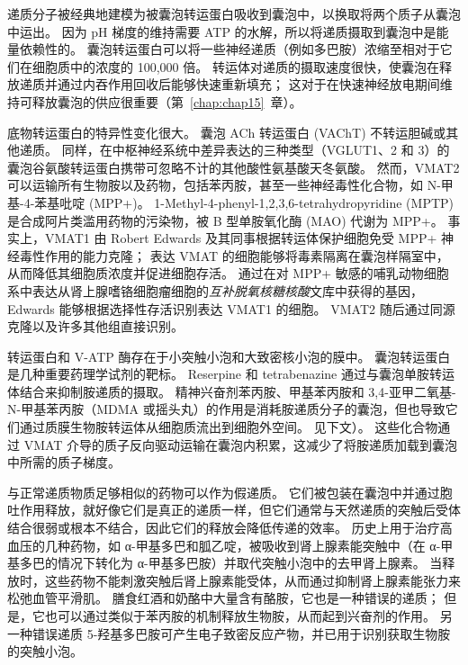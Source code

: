 \begin{figure}[htbp]
	\label{fig:16_1}
\end{figure}


递质分子被经典地建模为被囊泡转运蛋白吸收到囊泡中，以换取将两个质子从囊泡中运出。
因为 pH 梯度的维持需要 ATP 的水解，所以将递质摄取到囊泡中是能量依赖性的。
囊泡转运蛋白可以将一些神经递质（例如多巴胺）浓缩至相对于它们在细胞质中的浓度的 100,000 倍。
转运体对递质的摄取速度很快，使囊泡在释放递质并通过内吞作用回收后能够快速重新填充；
这对于在快速神经放电期间维持可释放囊泡的供应很重要（第~\ref{chap:chap15}~章）。


底物转运蛋白的特异性变化很大。
囊泡 ACh 转运蛋白 (VAChT) 不转运胆碱或其他递质。
同样，在中枢神经系统中差异表达的三种类型（VGLUT1、2 和 3）的囊泡谷氨酸转运蛋白携带可忽略不计的其他酸性氨基酸天冬氨酸。
然而，VMAT2 可以运输所有生物胺以及药物，包括苯丙胺，甚至一些神经毒性化合物，如 N-甲基-4-苯基吡啶 (MPP+)。
1-Methyl-4-phenyl-1,2,3,6-tetrahydropyridine (MPTP) 是合成阿片类滥用药物的污染物，被 B 型单胺氧化酶 (MAO) 代谢为 MPP+。
事实上，VMAT1 由 Robert Edwards 及其同事根据转运体保护细胞免受 MPP+ 神经毒性作用的能力克隆； 表达 VMAT 的细胞能够将毒素隔离在囊泡样隔室中，从而降低其细胞质浓度并促进细胞存活。
通过在对 MPP+ 敏感的哺乳动物细胞系中表达从肾上腺嗜铬细胞瘤细胞的\textit{互补脱氧核糖核酸}文库中获得的基因，Edwards 能够根据选择性存活识别表达 VMAT1 的细胞。
VMAT2 随后通过同源克隆以及许多其他组直接识别。


转运蛋白和 V-ATP 酶存在于小突触小泡和大致密核小泡的膜中。
囊泡转运蛋白是几种重要药理学试剂的靶标。 Reserpine 和 tetrabenazine 通过与囊泡单胺转运体结合来抑制胺递质的摄取。
精神兴奋剂苯丙胺、甲基苯丙胺和 3,4-亚甲二氧基-N-甲基苯丙胺（MDMA 或摇头丸）的作用是消耗胺递质分子的囊泡，但也导致它们通过质膜生物胺转运体从细胞质流出到细胞外空间。 见下文）。
这些化合物通过 VMAT 介导的质子反向驱动运输在囊泡内积累，这减少了将胺递质加载到囊泡中所需的质子梯度。


与正常递质物质足够相似的药物可以作为假递质。
它们被包装在囊泡中并通过胞吐作用释放，就好像它们是真正的递质一样，但它们通常与天然递质的突触后受体结合很弱或根本不结合，因此它们的释放会降低传递的效率。
历史上用于治疗高血压的几种药物，如 α-甲基多巴和胍乙啶，被吸收到肾上腺素能突触中（在 α-甲基多巴的情况下转化为 α-甲基多巴胺）并取代突触小泡中的去甲肾上腺素。
当释放时，这些药物不能刺激突触后肾上腺素能受体，从而通过抑制肾上腺素能张力来松弛血管平滑肌。
膳食红酒和奶酪中大量含有酪胺，它也是一种错误的递质；
但是，它也可以通过类似于苯丙胺的机制释放生物胺，从而起到兴奋剂的作用。
另一种错误递质 5-羟基多巴胺可产生电子致密反应产物，并已用于识别获取生物胺的突触小泡。


